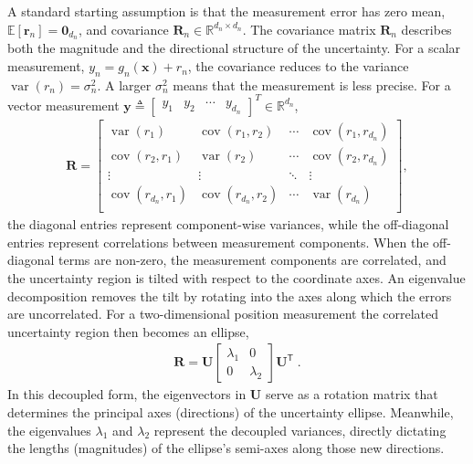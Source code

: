 A standard starting assumption is that the measurement error has zero mean, $\mathbb{E}[\mathbf{r}_n]=\mathbf{0}_{d_n}$, and covariance $\mathbf{R}_n\in\mathbb{R}^{d_n\times d_n}$. The covariance matrix $\mathbf{R}_n$ describes both the magnitude and the directional structure of the uncertainty. For a scalar measurement, $y_n=g_n(\mathbf{x})+r_n$, the covariance reduces to the variance $\operatorname{var}(r_n)=\sigma_n^2$. A larger $\sigma_n^2$ means that the measurement is less precise. For a vector measurement $\mathbf{y}\triangleq \begin{bmatrix} y_{1} & y_{2} & \cdots & y_{d_n} \end{bmatrix}^T \in \mathbb{R}^{d_n}$,
\begin{align*}
\mathbf{R}=
\begin{bmatrix}
\operatorname{var}(r_{1}) & \operatorname{cov}(r_{1},r_{2}) & \cdots & \operatorname{cov}(r_{1},r_{d_n})\\
\operatorname{cov}(r_{2},r_{1}) & \operatorname{var}(r_{2}) & \cdots & \operatorname{cov}(r_{2},r_{d_n}) \\
\vdots & \vdots & \ddots & \vdots\\
\operatorname{cov}(r_{d_n},r_{1})  & \operatorname{cov}(r_{d_n},r_{2}) & \cdots & \operatorname{var}(r_{d_n}) \\
\end{bmatrix},
\end{align*}
the diagonal entries represent component-wise variances, while the off-diagonal entries represent correlations between measurement components. When the off-diagonal terms are non-zero, the measurement components are correlated, and the uncertainty region is tilted with respect to the coordinate axes. An eigenvalue decomposition removes the tilt by rotating into the axes along which the errors are uncorrelated. For a two-dimensional position measurement
the correlated uncertainty region then becomes an ellipse,
\begin{align*}
\mathbf{R}=\mathbf{U}\left[\begin{matrix}\lambda _{1}&0\\ 0&\lambda _{2}\end{matrix}\right]\mathbf{U}^{\mathsf{T}} \;.
\end{align*}
In this decoupled form, the eigenvectors in $\mathbf{U}$ serve as a rotation matrix that determines the principal axes (directions) of the uncertainty ellipse. Meanwhile, the eigenvalues $\lambda _{1}$ and $\lambda _{2}$ represent the decoupled variances, directly dictating the lengths (magnitudes) of the ellipse's semi-axes along those new directions.

